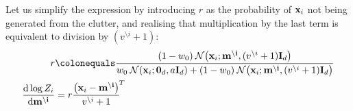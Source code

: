 \documentclass[11pt]{article}
\begin{document}
Let us simplify the expression by introducing $r$ as the probability of 
$\mathbf{x}_i$ not being generated from the clutter, and realising that 
multiplication by the last term is equivalent to division by 
$(v^{\setminus i} + 1)$:
\begin{align}
	r &\colonequals
			\frac{(1 - w_0)
				\norm\!\left(\vek{x}_i; \vek{m^{\setminus i}}, (v^{\setminus i} 
							+ 1)\unity_{d}\right)
				}
			{w_0  \norm(\vek{x}_i; \vek{0}_d, a\unity_{d})
			+  (1 - w_0)\norm\!\left(\vek{x}_i; \vek{m^{\setminus i}}, (v^{\setminus i} 
			+ 1)\unity_{d}\right)
			}\\
	\frac{\byd \log Z_i}{\byd \vek{m^{\setminus i}}} &=
		r\frac{\big(\vek{x}_i - \vek{m^{\setminus 
					i}}\rlap{$\big)^T$}\hphantom{\big)}}
					{v^{\setminus i} + 1}
\end{align}
\end{document}
